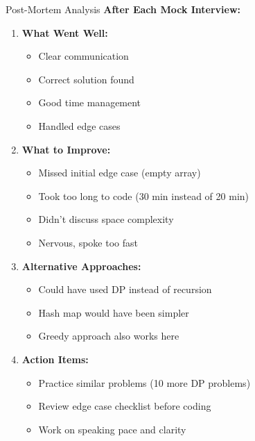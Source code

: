 \documentclass[aspectratio=169,xcolor=dvipsnames]{beamer}
\begin{document}
\begin{frame}{Post-Mortem Analysis}
  \textbf{After Each Mock Interview:}

  \vspace{0.3cm}
  \begin{enumerate}
    \item \textbf{What Went Well:}
    \begin{itemize}
      \item Clear communication
      \item Correct solution found
      \item Good time management
      \item Handled edge cases
    \end{itemize}

    \vspace{0.2cm}
    \item \textbf{What to Improve:}
    \begin{itemize}
      \item Missed initial edge case (empty array)
      \item Took too long to code (30 min instead of 20 min)
      \item Didn't discuss space complexity
      \item Nervous, spoke too fast
    \end{itemize}

    \vspace{0.2cm}
    \item \textbf{Alternative Approaches:}
    \begin{itemize}
      \item Could have used DP instead of recursion
      \item Hash map would have been simpler
      \item Greedy approach also works here
    \end{itemize}

    \vspace{0.2cm}
    \item \textbf{Action Items:}
    \begin{itemize}
      \item Practice similar problems (10 more DP problems)
      \item Review edge case checklist before coding
      \item Work on speaking pace and clarity
    \end{itemize}
  \end{enumerate}
\end{frame}
\end{document}
